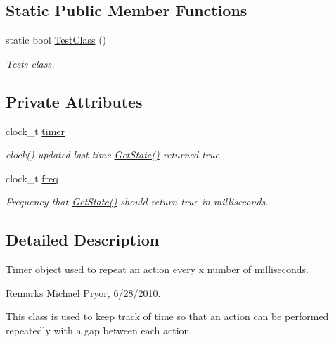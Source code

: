 \subsection*{Static Public Member Functions}
\begin{DoxyCompactItemize}
\item 
static bool \hyperlink{class_timer_ace0d8b39951732f96327cc3e06711c38}{TestClass} ()
\begin{DoxyCompactList}\small\item\em Tests class. \item\end{DoxyCompactList}\end{DoxyCompactItemize}
\subsection*{Private Attributes}
\begin{DoxyCompactItemize}
\item 
\hypertarget{class_timer_ac0cfb5de0274313d265e3fe634463491}{
clock\_\-t \hyperlink{class_timer_ac0cfb5de0274313d265e3fe634463491}{timer}}
\label{class_timer_ac0cfb5de0274313d265e3fe634463491}

\begin{DoxyCompactList}\small\item\em clock() updated last time \hyperlink{class_timer_a928753507fd1ea96ba00e7e4c3208058}{GetState()} returned true. \item\end{DoxyCompactList}\item 
\hypertarget{class_timer_a79e2af3b256a4ef822dfd838d868f5ce}{
clock\_\-t \hyperlink{class_timer_a79e2af3b256a4ef822dfd838d868f5ce}{freq}}
\label{class_timer_a79e2af3b256a4ef822dfd838d868f5ce}

\begin{DoxyCompactList}\small\item\em Frequency that \hyperlink{class_timer_a928753507fd1ea96ba00e7e4c3208058}{GetState()} should return true in milliseconds. \item\end{DoxyCompactList}\end{DoxyCompactItemize}


\subsection{Detailed Description}
Timer object used to repeat an action every x number of milliseconds. \begin{DoxyRemark}{Remarks}
Michael Pryor, 6/28/2010.
\end{DoxyRemark}
This class is used to keep track of time so that an action can be performed repeatedly with a gap between each action. \par
\par


